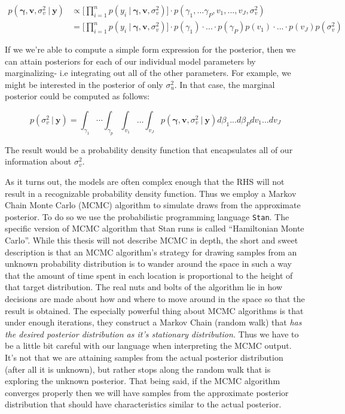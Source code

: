 \documentclass[12pt,twoside]{reedthesis}
\begin{document}
\[
\begin{aligned}
p(\boldsymbol{\gamma}, \mathbf{v},  \sigma_v^2 \ | \ \mathbf{y}) &\propto \bigg[\prod_{i=1}^np(y_i \ | \ \boldsymbol{\gamma}, \mathbf{v},  \sigma_v^2)\bigg]\cdot p(\gamma_1, ...\gamma_P, v_1,... ,v_J, \sigma_{v}^2) \\
 &= \bigg[\prod_{i=1}^np(y_i \ | \ \boldsymbol{\gamma}, \mathbf{v},  \sigma_{v}^2)\bigg]\cdot p(\gamma_1)\cdot...\cdot p(\gamma_P)p(v_1) \cdot ... \cdot p(v_J)p(\sigma_{v}^2)
\end{aligned}
\]

If we we're able to compute a simple form expression for the posterior, then we can attain posteriors for each of our individual model parameters by marginalizing- i.e integrating out all of the other parameters. For example, we might be interested in the posterior of only \(\sigma_u^2\). In that case, the marginal posterior could be computed as follows:

\[
p(\sigma_{v}^2 \ | \ \mathbf{y}) = \int_{\gamma_1} \cdots \int_{\gamma_p} \int_{v_1} \dots \int_{v_J} p(\boldsymbol{\gamma}, \mathbf{v},  \sigma_{v}^2 \ | \ \mathbf{y}) d\beta_1 ... d\beta_P dv_1 ... dv_J
\]

The result would be a probability density function that encapsulates all of our information about \(\sigma_{v}^2\).

As it turns out, the models are often complex enough that the RHS will not result in a recognizable probability density function. Thus we employ a Markov Chain Monte Carlo (MCMC) algorithm to simulate draws from the approximate posterior. To do so we use the probabilistic programming language \texttt{Stan}. The specific version of MCMC algorithm that Stan runs is called ``Hamiltonian Monte Carlo''. While this thesis will not describe MCMC in depth, the short and sweet description is that an MCMC algorithm's strategy for drawing samples from an unknown probability distribution is to wander around the space in such a way that the amount of time spent in each location is proportional to the height of that target distribution. The real nuts and bolts of the algorithm lie in how decisions are made about how and where to move around in the space so that the result is obtained. The especially powerful thing about MCMC algorithms is that under enough iterations, they construct a Markov Chain (random walk) that \emph{has the desired posterior distribution as it's stationary distribution.} Thus we have to be a little bit careful with our language when interpreting the MCMC output. It's not that we are attaining samples from the actual posterior distribution (after all it is unknown), but rather stops along the random walk that is exploring the unknown posterior. That being said, if the MCMC algorithm converges properly then we will have samples from the approximate posterior distribution that should have characteristics similar to the actual posterior.
\end{document}
